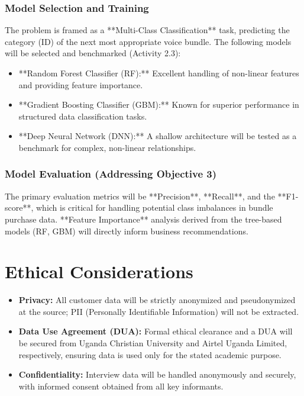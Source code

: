 \documentclass[12pt, a4paper]{report}
\begin{document}
\subsubsection{Model Selection and Training}
The problem is framed as a **Multi-Class Classification** task, predicting the category (ID) of the next most appropriate voice bundle. The following models will be selected and benchmarked (Activity 2.3):
\begin{itemize}
    \item **Random Forest Classifier (RF):** Excellent handling of non-linear features and providing feature importance.
    \item **Gradient Boosting Classifier (GBM):** Known for superior performance in structured data classification tasks.
    \item **Deep Neural Network (DNN):** A shallow architecture will be tested as a benchmark for complex, non-linear relationships.
\end{itemize}

\subsubsection{Model Evaluation (Addressing Objective 3)}
The primary evaluation metrics will be **Precision**, **Recall**, and the **F1-score**, which is critical for handling potential class imbalances in bundle purchase data. **Feature Importance** analysis derived from the tree-based models (RF, GBM) will directly inform business recommendations.

\section{Ethical Considerations}
\begin{itemize}
    \item \textbf{Privacy:} All customer data will be strictly anonymized and pseudonymized at the source; PII (Personally Identifiable Information) will not be extracted.
    \item \textbf{Data Use Agreement (DUA):} Formal ethical clearance and a DUA will be secured from Uganda Christian University and Airtel Uganda Limited, respectively, ensuring data is used only for the stated academic purpose.
    \item \textbf{Confidentiality:} Interview data will be handled anonymously and securely, with informed consent obtained from all key informants.
\end{itemize}
\clearpage
\end{document}

